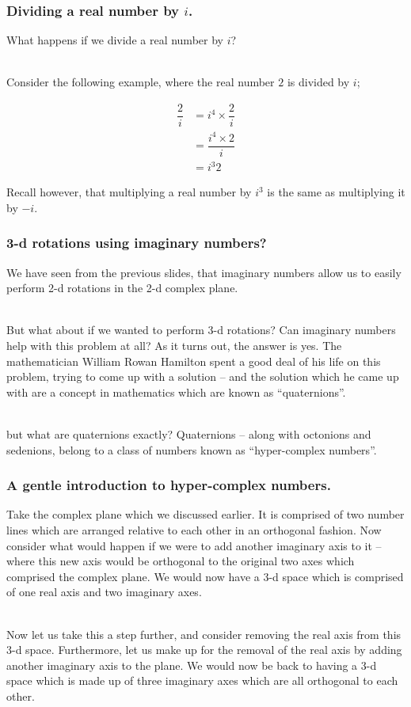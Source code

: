 %
%

\begin{frame}
\frametitle{Dividing a real number by \(i\).}

What happens if we divide a real number by \(i\)?\\~\

Consider the following example, where the real number \(2\) is divided by \(i\);

\begin{align*}
\dfrac{2}{i} &= i^{4} \times \dfrac{2}{i}  \\
             &= \dfrac{i^{4} \times 2}{i}  \\
             &= i^{3}2
\end{align*}

Recall however, that multiplying a real number by \(i^{3}\) is the same as multiplying it by \(-i\).

\end{frame}


%
%

\begin{frame}
\frametitle{3-d rotations using imaginary numbers?}

We have seen from the previous slides, that imaginary numbers allow us to easily perform 2-d rotations in the 2-d complex plane.\\~\

But what about if we wanted to perform 3-d rotations? Can imaginary numbers help with this problem at all? As it turns out, the answer is yes. 
The mathematician William Rowan Hamilton spent a good deal of his life on this problem, trying to come up with a solution -- and the solution which
he came up with are a concept in mathematics which are known as ``quaternions''.\\~\

but what are quaternions exactly? Quaternions -- along with octonions and sedenions, belong to a class of numbers known as ``hyper-complex numbers''.

\end{frame}


\begin{frame}
\frametitle{A gentle introduction to hyper-complex numbers.}

Take the complex plane which we discussed earlier. It is comprised of two number lines which are arranged relative to each other in an orthogonal fashion.
Now consider what would happen if we were to add another imaginary axis to it -- where this new axis would be
orthogonal to the original two axes which comprised the complex plane. We would now have a 3-d space which is comprised of one real axis and two imaginary axes.\\~\

Now let us take this a step further, and consider removing the real axis from this 3-d space. Furthermore, let us make up for the removal of the real
axis by adding another imaginary axis to the plane. We would now be back to having a 3-d space which is made up of three imaginary axes which are all 
orthogonal to each other.

\end{frame}



